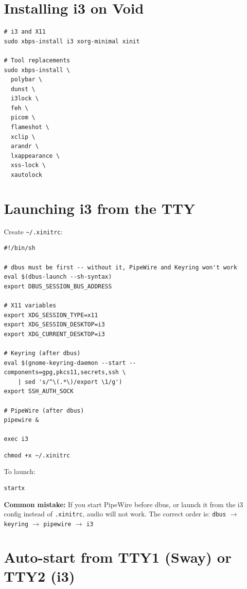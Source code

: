 \documentclass[12pt, a4paper]{book}
\begin{document}
\section{Installing i3 on Void}

\begin{lstlisting}
# i3 and X11
sudo xbps-install i3 xorg-minimal xinit

# Tool replacements
sudo xbps-install \
  polybar \
  dunst \
  i3lock \
  feh \
  picom \
  flameshot \
  xclip \
  arandr \
  lxappearance \
  xss-lock \
  xautolock
\end{lstlisting}

\section{Launching i3 from the TTY}

Create \texttt{\textasciitilde/.xinitrc}:

\begin{lstlisting}
#!/bin/sh

# dbus must be first -- without it, PipeWire and Keyring won't work
eval $(dbus-launch --sh-syntax)
export DBUS_SESSION_BUS_ADDRESS

# X11 variables
export XDG_SESSION_TYPE=x11
export XDG_SESSION_DESKTOP=i3
export XDG_CURRENT_DESKTOP=i3

# Keyring (after dbus)
eval $(gnome-keyring-daemon --start --components=gpg,pkcs11,secrets,ssh \
    | sed 's/^\(.*\)/export \1/g')
export SSH_AUTH_SOCK

# PipeWire (after dbus)
pipewire &

exec i3
\end{lstlisting}

\begin{lstlisting}
chmod +x ~/.xinitrc
\end{lstlisting}

To launch:
\begin{lstlisting}
startx
\end{lstlisting}

\begin{warningbox}
\textbf{Common mistake:} If you start PipeWire before dbus, or launch it from the i3 config instead of \texttt{.xinitrc}, audio will not work. The correct order is: \texttt{dbus} $\to$ \texttt{keyring} $\to$ \texttt{pipewire} $\to$ \texttt{i3}
\end{warningbox}

\section{Auto-start from TTY1 (Sway) or TTY2 (i3)}
\end{document}
